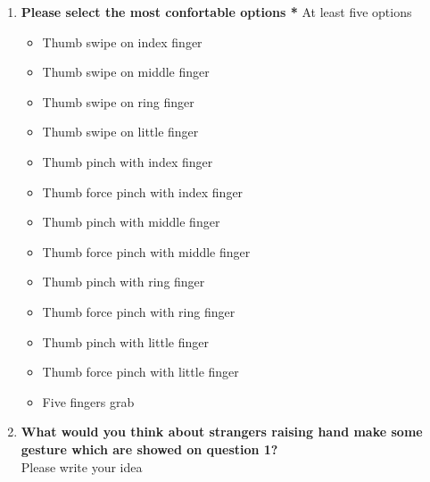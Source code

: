   \begin{enumerate}
      \kaishu
      \item \textbf{Please select the most confortable options *}
      At least five options
      \begin{itemize}
        \item Thumb swipe on index finger
        \item Thumb swipe on middle finger
        \item Thumb swipe on ring finger
        \item Thumb swipe on little finger
        \item Thumb pinch with index finger
        \item Thumb force pinch with index finger
        \item Thumb pinch with middle finger
        \item Thumb force pinch with middle finger
        \item Thumb pinch with ring finger
        \item Thumb force pinch with ring finger
        \item Thumb pinch with little finger
        \item Thumb force pinch with little finger
        \item Five fingers grab
      \end{itemize}
      \item \textbf{What would you think about strangers raising hand make some gesture which are showed on question 1?}\\
      Please write your idea


\end{enumerate}
